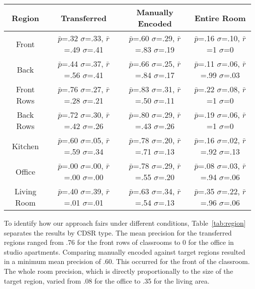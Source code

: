 \begin{table*}
	\center
\begin{tabular}{|c|c|c|c|}
\hline
Region & Transferred & Manually Encoded & Entire Room \\
\hline
Front & $\bar{p}$=.32 $\sigma$=.33, $\bar{r}$=.49 $\sigma$=.41 & $\bar{p}$=.60 $\sigma$=.29, $\bar{r}$=.83 $\sigma$=.19  & $\bar{p}$=.16 $\sigma$=.10, $\bar{r}$=1 $\sigma$=0  \\
\hline
Back & $\bar{p}$=.44 $\sigma$=.37, $\bar{r}$=.56 $\sigma$=.41 & $\bar{p}$=.66 $\sigma$=.25, $\bar{r}$=.84 $\sigma$=.17  & $\bar{p}$=.11 $\sigma$=.06, $\bar{r}$=.99 $\sigma$=.03  \\
\hline
Front Rows & $\bar{p}$=.76 $\sigma$=.27, $\bar{r}$=.28 $\sigma$=.21 & $\bar{p}$=.83 $\sigma$=.31, $\bar{r}$=.50 $\sigma$=.11  & $\bar{p}$=.22 $\sigma$=.08, $\bar{r}$=1 $\sigma$=0  \\
\hline
Back Rows & $\bar{p}$=.72 $\sigma$=.30, $\bar{r}$=.42 $\sigma$=.26 & $\bar{p}$=.80 $\sigma$=.29, $\bar{r}$=.43 $\sigma$=.26  & $\bar{p}$=.19 $\sigma$=.06, $\bar{r}$=1 $\sigma$=0  \\
\hline
Kitchen & $\bar{p}$=.60 $\sigma$=.05, $\bar{r}$=.59 $\sigma$=.34 & $\bar{p}$=.78 $\sigma$=.20, $\bar{r}$=.71 $\sigma$=.13  & $\bar{p}$=.16 $\sigma$=.02, $\bar{r}$=.92 $\sigma$=.13  \\
\hline
Office & $\bar{p}$=.00 $\sigma$=.00, $\bar{r}$=.00 $\sigma$=.00 & $\bar{p}$=.78 $\sigma$=.29, $\bar{r}$=.55 $\sigma$=.20  & $\bar{p}$=.08 $\sigma$=.03, $\bar{r}$=.94 $\sigma$=.06  \\
\hline
Living Room & $\bar{p}$=.40 $\sigma$=.39, $\bar{r}$=.01 $\sigma$=.01 & $\bar{p}$=.63 $\sigma$=.34, $\bar{r}$=.54 $\sigma$=.13  & $\bar{p}$=.35 $\sigma$=.22, $\bar{r}$=.96 $\sigma$=.06  \\
\hline
\end{tabular}
\caption{Performance by Region Type}
  \label{tab:region}	
\end{table*}

To identify how our approach fairs under different conditions, Table~\ref{tab:region} separates the results by CDSR type. The mean precision for the transferred regions ranged from .76 for the front rows of classrooms to 0 for the office in studio apartments. Comparing manually encoded against target regions resulted in a minimum mean precision of .60. This occurred for the front of the classroom. The whole room precision, which is directly proportionally to the size of the target region, varied from .08 for the office to .35 for the living area.

